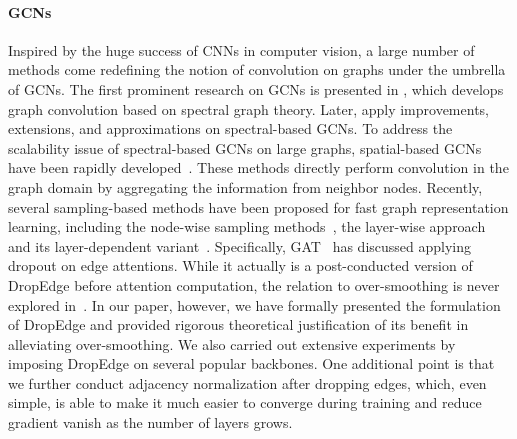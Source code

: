 \documentclass{article}
\begin{document}
\paragraph{GCNs}
Inspired by the huge success of CNNs in computer vision, a large number of methods come redefining the notion of convolution on graphs under the umbrella of GCNs. The first prominent research on GCNs is presented in \citet{bruna2013spectral}, which develops graph convolution based on spectral graph theory. Later, \citet{Kipf2017,defferrard2016convolutional,henaff2015deep,Li2018a,Levie2017} apply improvements, extensions, and approximations on spectral-based GCNs. To address the scalability issue of spectral-based GCNs on large graphs, spatial-based GCNs have been rapidly developed~\citep{hamilton2017inductive,Monti2017,niepert2016learning,Gao2018}. These methods directly perform convolution in the graph domain by aggregating the information from neighbor nodes. Recently, several sampling-based methods have been proposed for fast graph representation learning, including the node-wise sampling methods~\citep{hamilton2017inductive}, the layer-wise approach~\citep{chen2018fastgcn} and its layer-dependent variant~\citep{Huang2018}. Specifically, GAT~\citep{DBLP:journals/corr/abs-1710-10903} has discussed applying dropout on edge attentions. While it actually is a post-conducted version of DropEdge before attention computation, the relation to over-smoothing is never explored in~\citet{DBLP:journals/corr/abs-1710-10903}. In our paper, however, we have formally presented the formulation of DropEdge and provided rigorous theoretical justification of its benefit in alleviating over-smoothing. We also carried out extensive experiments by imposing DropEdge on several popular backbones. One additional point is that we further conduct adjacency normalization after dropping edges, which, even simple, is able to make it much easier to converge during training and reduce gradient vanish as the number of layers grows.    
\end{document}
